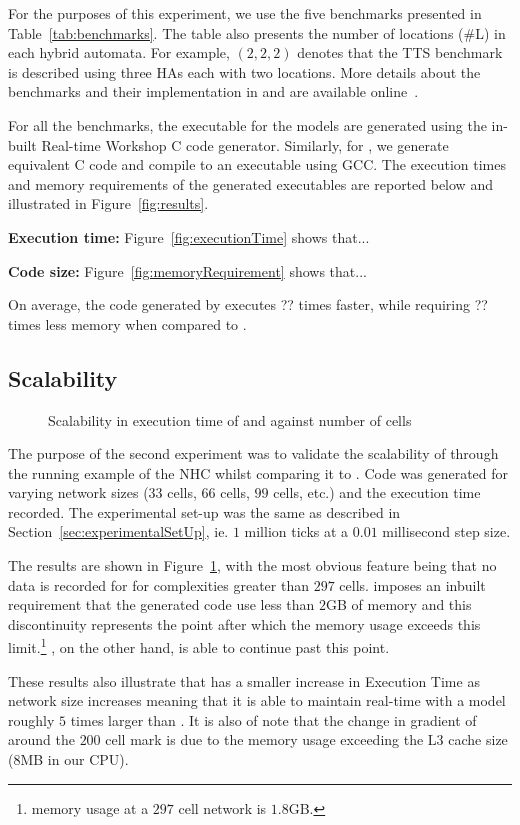 For the purposes of this experiment, we use the five benchmarks presented in Table~\ref{tab:benchmarks}.
The table also presents the number of locations (\#L) in each hybrid automata.
For example, $(2, 2, 2)$ denotes that the \acf{TTS} benchmark is described using three \acp{HA} each with two locations.
More details about the benchmarks and their implementation in \ourTool and \simulink are available online~\cite{githubBenchmarks}.

For all the benchmarks, the executable for the \simulink models are generated using the in-built Real-time Workshop\textsuperscript{\textregistered} C code generator.
Similarly, for \ourTool, we generate equivalent C code and compile to an executable using GCC.
The execution times and memory requirements of the generated executables are reported below and illustrated in Figure~\ref{fig:results}.

\textbf{Execution time:} 
Figure~\ref{fig:executionTime} shows that...

\textbf{Code size:}
Figure~\ref{fig:memoryRequirement} shows that...

On average, the code generated by \ourTool executes ?? times faster, while requiring ?? times less memory when compared to \simulink.




\subsection{Scalability}

\begin{figure}[htbp]
	\centering
	
	\caption{Scalability in  execution time of \simulink and \ourTool against number of cells}
	\label{fig:scalability}
\end{figure}

The purpose of the second experiment was to validate the scalability of \ourTool through the running example of the \ac{NHC} whilst comparing it to \simulink.
Code was generated for varying network sizes ($33$ cells, $66$ cells, $99$ cells, etc.) and the execution time recorded.
The experimental set-up was the same as described in Section~\ref{sec:experimentalSetUp}, ie. $1$ million ticks at a $0.01$ millisecond step size.

The results are shown in Figure~\ref{fig:scalability}, with the most obvious feature being that no data is recorded for \simulink for complexities greater than $297$ cells.
\simulink imposes an inbuilt requirement that the generated code use less than $2$GB of memory and this discontinuity represents the point after which the memory usage exceeds this limit.\footnote{\simulink memory usage at a $297$ cell network is $1.8$GB.}
\ourTool, on the other hand, is able to continue past this point.

These results also illustrate that \ourTool has a smaller increase in Execution Time as network size increases meaning that it is able to maintain real-time with a model roughly $5$ times larger than \simulink.
It is also of note that the change in gradient of \ourTool around the $200$ cell mark is due to the memory usage exceeding the L$3$ cache size ($8$MB in our CPU).